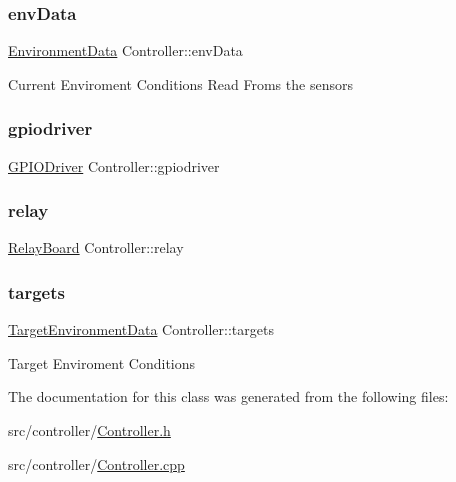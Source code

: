 \subsubsection{\texorpdfstring{env\+Data}{envData}}
{\footnotesize\ttfamily \hyperlink{structEnvironmentData}{Environment\+Data} Controller\+::env\+Data}

Current Enviroment Conditions Read Froms the sensors \mbox{\label{classController_aa3d6dde5a09dfc1a34bfaee1e7fa3434}} 
\subsubsection{\texorpdfstring{gpiodriver}{gpiodriver}}
{\footnotesize\ttfamily \hyperlink{classGPIODriver}{G\+P\+I\+O\+Driver} Controller\+::gpiodriver\hspace{0.3cm}{\ttfamily [private]}}

\mbox{\label{classController_aa3f1d7aae706a5440adf520cbd7fb216}} 
\subsubsection{\texorpdfstring{relay}{relay}}
{\footnotesize\ttfamily \hyperlink{classRelayBoard}{Relay\+Board} Controller\+::relay\hspace{0.3cm}{\ttfamily [private]}}

\mbox{\label{classController_a8f2fb8295fd3da6ebc8bdb0f25036322}} 
\subsubsection{\texorpdfstring{targets}{targets}}
{\footnotesize\ttfamily \hyperlink{structTargetEnvironmentData}{Target\+Environment\+Data} Controller\+::targets}

Target Enviroment Conditions 

The documentation for this class was generated from the following files\+:\begin{DoxyCompactItemize}
\item 
src/controller/\hyperlink{Controller_8h}{Controller.\+h}\item 
src/controller/\hyperlink{Controller_8cpp}{Controller.\+cpp}\end{DoxyCompactItemize}
